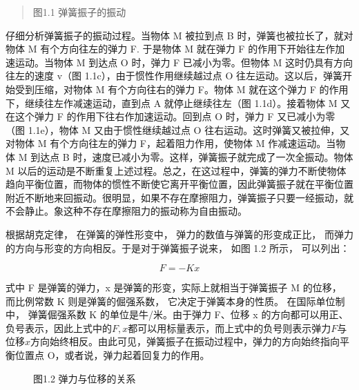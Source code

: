 \begin{quote}
图1.1 弹簧振子的振动
\end{quote}

仔细分析弹簧振子的振动过程。当物体 M 被拉到点 B
时，弹簧也被拉长了，就对物体 M 有个方向往左的弹力 F. 于是物体 M 就在弹力
F 的作用下开始往左作加速运动。当物体 M 到达点 O 时，弹力 F
已减小为零。但物体 M 这时仍具有方向往左的速度 v（图
1.1c），由于惯性作用继续越过点 O
往左运动。这以后，弹簧开始受到压缩，对物体 M 有个方向往右的弹力 F。物体
M 就在这个弹力 F 的作用下，继续往左作减速运动，直到点 A
就停止继续往左（图 1.1d）。接着物体 M 又在这个弹力 F
的作用下往右作加速运动。回到点 O 时，弹力 F 又已减小为零（图
1.1e），物体 M 又由于惯性继续越过点 O
往右运动。这时弹簧又被拉伸，又对物体 M 有个方向往左的弹力
F，起着阻力作用，使物体 M 作减速运动。当物体 M 到达点 B
时，速度已减小为零。这样，弹簧振子就完成了一次全振动。物体 M
以后的运动是不断重复上述过程。总之，在这过程中，弹簧的弹力不断使物体趋向平衡位置，而物体的惯性不断使它离开平衡位置，因此弹簧振子就在平衡位置附近不断地来回振动。很明显，如果不存在摩擦阻力，弹簧振子只要一经振动，就不会静止。象这种不存在摩擦阻力的振动称为自由振动。

根据胡克定律， 在弹簧的弹性形变中， 弹力的数值与弹簧的形变成正比，
而弹力的方向与形变的方向相反。于是对于弹簧振子说来， 如图 1.2 所示，
可以列出：

\[
F = - K x \tag {1.2}
\]

式中 F 是弹簧的弹力，x 是弹簧的形变，实际上就相当于弹簧振子 M 的位移，
而比例常数 K 则是弹簧的倔强系数， 它决定于弹簧本身的性质。
在国际单位制中， 弹簧倔强系数 K 的单位是牛/米。由于弹力 F、位移 x
的方向都可以用正、负号表示，因此上式中的\(F, x\)都可以用标量表示，而上式中的负号则表示弹力\(F\)与位移\(x\)方向始终相反。由此可见，弹簧振子在振动过程中，弹力的方向始终指向平衡位置点
O，或者说，弹力起着回复力的作用。

\begin{figure}
\centering
\usetikzlibrary{arrows.meta,calc}
\caption{图1.2 弹力与位移的关系}
\end{figure}

